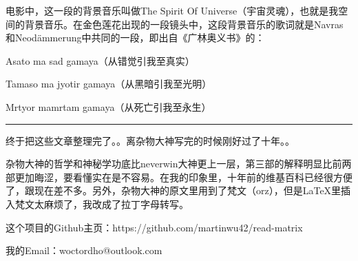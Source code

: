 \documentclass[UTF8]{ctexart}
\newcommand{\myparsep}{\noindent \rule[0.5ex]{\linewidth}{1pt}}
\newenvironment{myquote}{\color{green} \setlength{\leftskip}{6em} \setlength{\rightskip}{4em} \setlength{\parindent}{-2em}}{\par}
\begin{document}
电影中，这一段的背景音乐叫做The Spirit Of Universe（宇宙灵魂），也就是我空间的背景音乐。在金色莲花出现的一段镜头中，这段背景音乐的歌词就是Navras和Neodämmerung中共同的一段，即出自《广林奥义书》的：

\begin{myquote}
Asato ma sad gamaya（从错觉引我至真实）

Tamaso ma jyotir gamaya（从黑暗引我至光明）

Mrtyor mamrtam gamaya（从死亡引我至永生）
\end{myquote}


\myparsep

终于把这些文章整理完了。。离杂物大神写完的时候刚好过了十年。。

杂物大神的哲学和神秘学功底比neverwin大神更上一层，第三部的解释明显比前两部更加晦涩，要看懂实在是不容易。在我的印象里，十年前的维基百科已经很方便了，跟现在差不多。另外，杂物大神的原文里用到了梵文（orz），但是LaTeX里插入梵文太麻烦了，我改成了拉丁字母转写。

这个项目的Github主页：https://github.com/martinwu42/read-matrix

我的Email：woctordho@outlook.com

\end{document}
